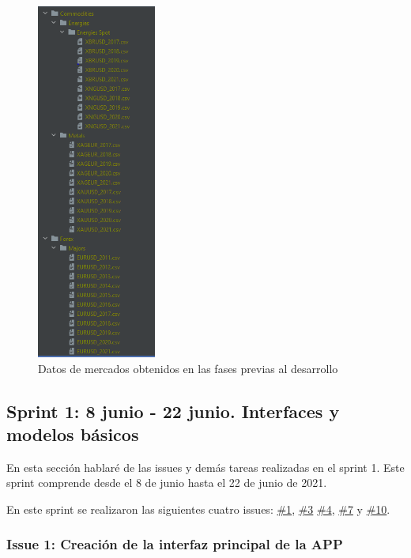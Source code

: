 \begin{figure}[h]
	\centering
	\includegraphics[width=0.35\textwidth]{imagenes/datos_obtenidos.png}
	\caption{Datos de mercados obtenidos en las fases previas al desarrollo} \label{datos_obtenidos}
\end{figure}

\subsection{Sprint 1: 8 junio - 22 junio. Interfaces y modelos básicos}

En esta sección hablaré de las issues y demás tareas realizadas en el sprint 1. Este sprint comprende desde el 8 de junio hasta el 22 de junio de 2021. \newline

En este sprint se realizaron las siguientes cuatro issues: \color{blue}\href{https://github.com/mcarmona99/TFG/issues/1}{\#1}, \href{https://github.com/mcarmona99/TFG/issues/3}{\#3} \href{https://github.com/mcarmona99/TFG/issues/4}{\#4}, \href{https://github.com/mcarmona99/TFG/issues/7}{\#7} \color{black}y\color{blue} \href{https://github.com/mcarmona99/TFG/issues/10}{\#10}\color{black}. \newline

\subsubsection{Issue 1: Creación de la interfaz principal de la APP}

